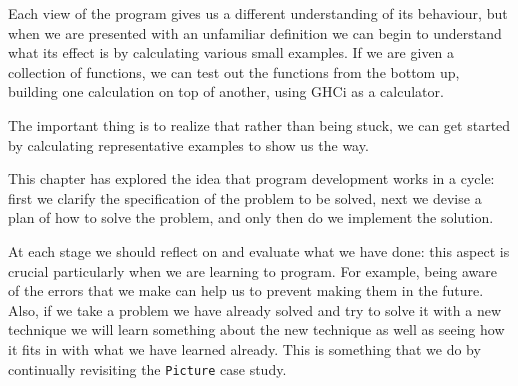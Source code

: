 Each view of the program gives us a different understanding of its
behaviour, but when we are presented with an unfamiliar definition we can
begin to understand what its effect is by calculating various small examples.
If we are given a collection of functions, we can test out the functions from
the bottom up, building one calculation on top of another, using GHCi as a calculator. 
 
The important
thing is to realize that rather than being stuck, we can get started by
calculating representative examples to show us the way.

\begin{summary}
This chapter has explored the idea that program development works in a cycle: first we
clarify the specification of the problem to be solved, next we devise a
plan of how to solve the problem, and only then do we implement the
solution. 

At each stage we should reflect on and evaluate what we have
done: this aspect is crucial particularly when we are learning to
program. For example, being aware of the errors that we make can help us to prevent
making them in the future. Also, if we take a problem we have already solved and 
try to solve it with a new technique we will learn something about the new technique
as well as seeing how it fits in with what we have learned already. This is
something that we do by continually revisiting the \texttt{Picture}
case study.

\end{summary}

%
